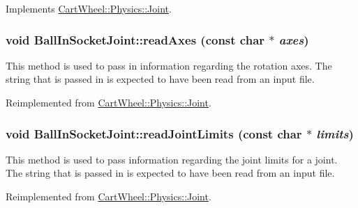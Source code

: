 Implements \hyperlink{classCartWheel_1_1Physics_1_1Joint_a6940878e260534a3803b14aa697b88f7}{CartWheel::Physics::Joint}.

\hypertarget{classCartWheel_1_1Physics_1_1BallInSocketJoint_a7d4d2b89877b4bc9afbb9971e2c1bb67}{
\subsubsection[{readAxes}]{\setlength{\rightskip}{0pt plus 5cm}void BallInSocketJoint::readAxes (const char $\ast$ {\em axes})}}
\label{classCartWheel_1_1Physics_1_1BallInSocketJoint_a7d4d2b89877b4bc9afbb9971e2c1bb67}
This method is used to pass in information regarding the rotation axes. The string that is passed in is expected to have been read from an input file. 

Reimplemented from \hyperlink{classCartWheel_1_1Physics_1_1Joint_a30ecfb4d75270a399661552df87c01de}{CartWheel::Physics::Joint}.

\hypertarget{classCartWheel_1_1Physics_1_1BallInSocketJoint_af1a97e525c526eac4b346d5e305ebb9c}{
\subsubsection[{readJointLimits}]{\setlength{\rightskip}{0pt plus 5cm}void BallInSocketJoint::readJointLimits (const char $\ast$ {\em limits})}}
\label{classCartWheel_1_1Physics_1_1BallInSocketJoint_af1a97e525c526eac4b346d5e305ebb9c}
This method is used to pass information regarding the joint limits for a joint. The string that is passed in is expected to have been read from an input file. 

Reimplemented from \hyperlink{classCartWheel_1_1Physics_1_1Joint_a3a70bb2e447b5acd7997545d3751a423}{CartWheel::Physics::Joint}.

